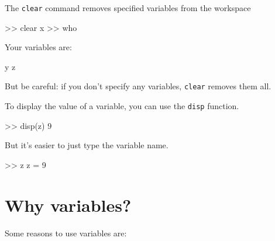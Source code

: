 \documentclass[
]{book}
\numberwithin{Answer}{chapter}
\numberwithin{Exercise}{chapter}
\begin{document}
The {\tt clear} command removes specified variables from the workspace

\begin{code}
>> clear x
>> who

Your variables are:

y z
\end{code}

But be careful: if you don't specify any variables, {\tt clear} removes them all.


To display the value of a variable, you can use the {\tt disp} function.

\begin{code}
>> disp(z)
     9
\end{code}

But it's easier to just type the variable name.

\begin{code}
>> z
z = 9
\end{code}


\section{Why variables?}

Some reasons to use variables are:

\end{document}

